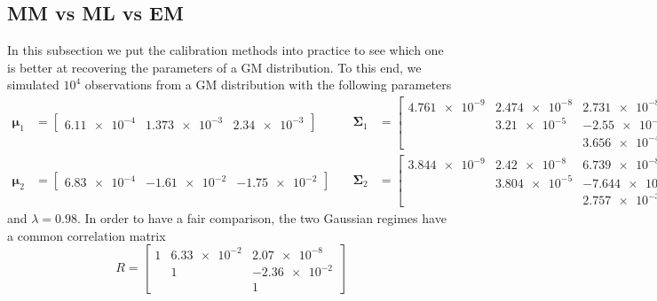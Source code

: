 \subsection{MM vs ML vs EM}
In this subsection we put the calibration methods into practice to see which one is better at recovering the parameters of a GM distribution. To this end, we simulated $10^4$ observations from a GM distribution with the following parameters
\begin{align*}
\bm{\mu}_1 & = 
\begin{bmatrix}
\num{6.11e-4} &  \num{1.373e-3} &  \num{2.34e-3}
\end{bmatrix}
\quad & \bm{\Sigma}_1 &= 
\begin{bmatrix}
\num{4.761e-9} & \num{2.474e-8} & \num{2.731e-8} \\
               & \num{3.21e-5}  & \num{-2.55e-6} \\
               &                & \num{3.656e-4}
\end{bmatrix} \\
\bm{\mu}_2 & = \begin{bmatrix}
\num{6.83e-4} &  \num{-1.61e-2} &  \num{-1.75e-2}
\end{bmatrix}
\quad & \bm{\Sigma}_2 &= 
\begin{bmatrix}
\num{3.844e-9} & \num{2.42e-8} & \num{6.739e-8} \\
               & \num{3.804e-5}  & \num{-7.644e-6} \\
               &                & \num{2.757e-3}
\end{bmatrix}
\end{align*}
and $\lambda = 0.98$. In order to have a fair comparison, the two Gaussian regimes have a common correlation matrix \[ R = 
\begin{bmatrix}
\num{1} & \num{6.33e-2} & \num{2.07e-8} \\
        & \num{1}       & \num{-2.36e-2} \\
        &                & \num{1}
\end{bmatrix}\]

